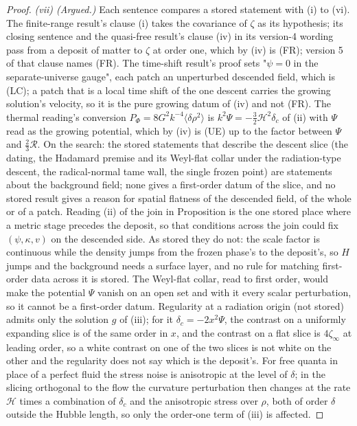 \begin{proof}
\emph{(vii) (Argued.)} Each sentence compares a stored statement with (i) to (vi). The finite-range result's clause (i) takes the covariance of $\zeta$ as its hypothesis; its closing sentence and the quasi-free result's clause (iv) in its version-4 wording pass from a deposit of matter to $\zeta$ at order one, which by (iv) is (FR); version 5 of that clause names (FR). The time-shift result's proof sets "$\psi = 0$ in the separate-universe gauge", each patch an unperturbed descended field, which is (LC); a patch that is a local time shift of the one descent carries the growing solution's velocity, so it is the pure growing datum of (iv) and not (FR). The thermal reading's conversion $P_{\Phi} = 8G^{2}k^{-4}\langle\delta\rho^{2}\rangle$ is $k^{2}\Psi = -\tfrac32\mathcal{H}^{2}\delta_{c}$ of (ii) with $\Psi$ read as the growing potential, which by (iv) is (UE) up to the factor between $\Psi$ and $\tfrac23\mathcal{R}$. On the search: the stored statements that describe the descent slice (the dating, the Hadamard premise and its Weyl-flat collar under the radiation-type descent, the radical-normal tame wall, the single frozen point) are statements about the background field; none gives a first-order datum of the slice, and no stored result gives a reason for spatial flatness of the descended field, of the whole or of a patch. Reading (ii) of the join in Proposition  is the one stored place where a metric stage precedes the deposit, so that conditions across the join could fix $(\psi, \kappa, v)$ on the descended side. As stored they do not: the scale factor is continuous while the density jumps from the frozen phase's to the deposit's, so $H$ jumps and the background needs a surface layer, and no rule for matching first-order data across it is stored. The Weyl-flat collar, read to first order, would make the potential $\Psi$ vanish on an open set and with it every scalar perturbation, so it cannot be a first-order datum. Regularity at a radiation origin (not stored) admits only the solution $g$ of (iii); for it $\delta_{c} = -2x^{2}\Psi$, the contrast on a uniformly expanding slice is of the same order in $x$, and the contrast on a flat slice is $4\zeta_{\infty}$ at leading order, so a white contrast on one of the two slices is not white on the other and the regularity does not say which is the deposit's. For free quanta in place of a perfect fluid the stress noise is anisotropic at the level of $\delta$; in the slicing orthogonal to the flow the curvature perturbation then changes at the rate $\mathcal{H}$ times a combination of $\delta_{c}$ and the anisotropic stress over $\rho$, both of order $\delta$ outside the Hubble length, so only the order-one term of (iii) is affected.
\end{proof}
